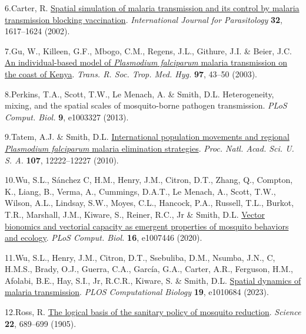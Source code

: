 \documentclass[
]{book}
\newlength{\cslhangindent}
\newlength{\cslentryspacingunit} %
\newenvironment{CSLReferences}[2] %
 {%
  \setlength{\parindent}{0pt}
  \ifodd #1
  \let\oldpar\par
  \def\par{\hangindent=\cslhangindent\oldpar}
  \fi
  \setlength{\parskip}{#2\cslentryspacingunit}
 }%
 {}
\begin{document}
\begin{CSLReferences}{0}{0}
\leavevmode{}%
6.Carter, R. \href{https://doi.org/10.1016/S0020-7519(02)00190-X}{Spatial simulation of malaria transmission and its control by malaria transmission blocking vaccination}. \emph{International Journal for Parasitology} \textbf{32}, 1617--1624 (2002).

\leavevmode{}%
7.Gu, W., Killeen, G.F., Mbogo, C.M., Regens, J.L., Githure, J.I. \& Beier, J.C. \href{https://doi.org/10.1016/s0035-9203(03)90018-6}{An individual-based model of \emph{{Plasmodium} falciparum} malaria transmission on the coast of {Kenya}}. \emph{Trans. R. Soc. Trop. Med. Hyg.} \textbf{97}, 43--50 (2003).

\leavevmode{}%
8.Perkins, T.A., Scott, T.W., Le Menach, A. \& Smith, D.L. Heterogeneity, mixing, and the spatial scales of mosquito-borne pathogen transmission. \emph{PLoS Comput. Biol.} \textbf{9}, e1003327 (2013).

\leavevmode{}%
9.Tatem, A.J. \& Smith, D.L. \href{https://doi.org/10.1073/pnas.1002971107}{International population movements and regional \emph{{Plasmodium} falciparum} malaria elimination strategies}. \emph{Proc. Natl. Acad. Sci. U. S. A.} \textbf{107}, 12222--12227 (2010).

\leavevmode{}%
10.Wu, S.L., Sánchez C, H.M., Henry, J.M., Citron, D.T., Zhang, Q., Compton, K., Liang, B., Verma, A., Cummings, D.A.T., Le Menach, A., Scott, T.W., Wilson, A.L., Lindsay, S.W., Moyes, C.L., Hancock, P.A., Russell, T.L., Burkot, T.R., Marshall, J.M., Kiware, S., Reiner, R.C., Jr \& Smith, D.L. \href{https://doi.org/10.1371/journal.pcbi.1007446}{Vector bionomics and vectorial capacity as emergent properties of mosquito behaviors and ecology}. \emph{PLoS Comput. Biol.} \textbf{16}, e1007446 (2020).

\leavevmode{}%
11.Wu, S.L., Henry, J.M., Citron, D.T., Ssebuliba, D.M., Nsumba, J.N., C, H.M.S., Brady, O.J., Guerra, C.A., García, G.A., Carter, A.R., Ferguson, H.M., Afolabi, B.E., Hay, S.I., Jr, R.C.R., Kiware, S. \& Smith, D.L. \href{https://doi.org/10.1371/journal.pcbi.1010684}{Spatial dynamics of malaria transmission}. \emph{PLOS Computational Biology} \textbf{19}, e1010684 (2023).

\leavevmode{}%
12.Ross, R. \href{https://doi.org/10.1126/science.22.570.689}{The logical basis of the sanitary policy of mosquito reduction}. \emph{Science} \textbf{22}, 689--699 (1905).


\end{CSLReferences}
\end{document}
